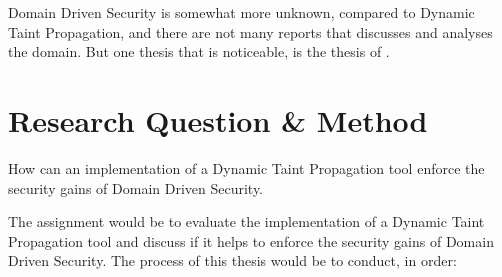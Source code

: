 \documentclass{../kththesis}
\begin{document}
Domain Driven Security is somewhat more unknown, compared to Dynamic Taint Propagation, and there are not many reports that discusses and analyses the domain. But one thesis that is noticeable, is the thesis of \textcite{Stendahl2016}.



\chapter{Research Question \& Method}
\begin{chapquote}{}
	How can an implementation of a Dynamic Taint Propagation tool enforce the security gains of Domain Driven Security.
\end{chapquote}

\noindent
The assignment would be to evaluate the implementation of a Dynamic Taint Propagation tool and discuss if it helps to enforce the security gains of Domain Driven Security. The process of this thesis would be to conduct, in order:
\end{document}
